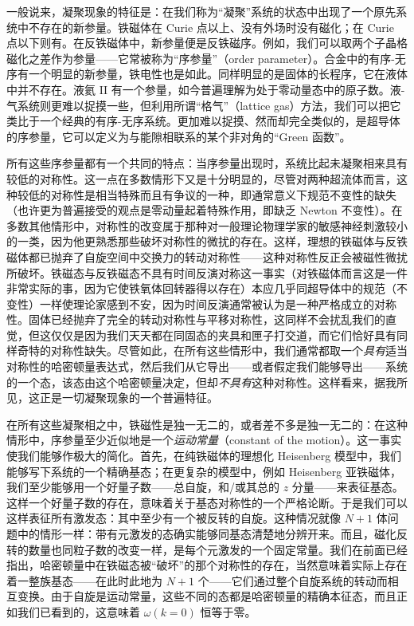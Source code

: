 一般说来，凝聚现象的特征是：在我们称为“凝聚”系统的状态中出现了一个原先系统中不存在的新参量。铁磁体在 Curie 点以上、没有外场时没有磁化；在 Curie 点以下则有。在反铁磁体中，新参量便是反铁磁序。例如，我们可以取两个子晶格磁化之差作为参量——它常被称为“序参量”（order parameter）。合金中的有序-无序有一个明显的新参量，铁电性也是如此。同样明显的是固体的长程序，它在液体中并不存在。液氦 II 有一个参量，如今普遍理解为处于零动量态中的原子数。液-气系统则更难以捉摸一些，但利用所谓“格气”（lattice gas）方法，我们可以把它类比于一个经典的有序-无序系统。更加难以捉摸、然而却完全类似的，是超导体的序参量，它可以定义为与能隙相联系的某个非对角的“Green 函数”。

所有这些序参量都有一个共同的特点：当序参量出现时，系统比起未凝聚相来具有较低的对称性。这一点在多数情形下又是十分明显的，尽管对两种超流体而言，这种较低的对称性是相当特殊而且有争议的一种，即通常意义下规范不变性的缺失（也许更为普遍接受的观点是零动量起着特殊作用，即缺乏 Newton 不变性）。在多数其他情形中，对称性的改变属于那种对一般理论物理学家的敏感神经刺激较小的一类，因为他更熟悉那些破坏对称性的微扰的存在。这样，理想的铁磁体与反铁磁体都已抛弃了自旋空间中交换力的转动对称性——这种对称性反正会被磁性微扰所破坏。铁磁态与反铁磁态不具有时间反演对称这一事实（对铁磁体而言这是一件非常实际的事，因为它使铁氧体回转器得以存在）本应几乎同超导体中的规范（不变性）一样使理论家感到不安，因为时间反演通常被认为是一种严格成立的对称性。固体已经抛弃了完全的转动对称性与平移对称性，这同样不会扰乱我们的直觉，但这仅仅是因为我们天天都在同固态的夹具和匣子打交道，而它们恰好具有同样奇特的对称性缺失。尽管如此，在所有这些情形中，我们通常都取一个\emph{具有}适当对称性的哈密顿量表达式，然后我们从它导出——或者假定我们能够导出——系统的一个态，该态由这个哈密顿量决定，但却\emph{不具有}这种对称性。这样看来，据我所见，这正是一切凝聚现象的一个普遍特征。

在所有这些凝聚相之中，铁磁性是独一无二的，或者差不多是独一无二的：在这种情形中，序参量至少近似地是一个\emph{运动常量}（constant of the motion）。这一事实使我们能够作极大的简化。首先，在纯铁磁体的理想化 Heisenberg 模型中，我们能够写下系统的一个精确基态；在更复杂的模型中，例如 Heisenberg 亚铁磁体，我们至少能够用一个好量子数——总自旋，和/或其总的 $z$ 分量——来表征基态。这样一个好量子数的存在，意味着关于基态对称性的一个严格论断。于是我们可以这样表征所有激发态：其中至少有一个被反转的自旋。这种情况就像 $N+1$ 体问题中的情形一样：带有元激发的态确实能够同基态清楚地分辨开来。而且，磁化反转的数量也同粒子数的改变一样，是每个元激发的一个固定常量。我们在前面已经指出，哈密顿量中在铁磁态被“破坏”的那个对称性的存在，当然意味着实际上存在着一整族基态——在此时此地为 $N+1$ 个——它们通过整个自旋系统的转动而相互变换。由于自旋是运动常量，这些不同的态都是哈密顿量的精确本征态，而且正如我们已看到的，这意味着 $\omega(k{=}0)$ 恒等于零。

